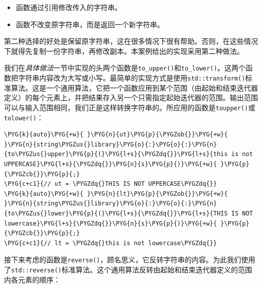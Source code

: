 
\begin{itemize}
\item 函数通过引用修改传入的字符串。



\item 函数不改变原字符串，而是返回一个新字符串。

\end{itemize}



第二种选择的好处是保留原字符串，这在很多情况下很有帮助。否则，在这些情况下就得先复制一份字符串，再修改副本。本案例给出的实现采用第二种做法。



我们在\textit{具体做法}一节中实现的头两个函数是\texttt{to\_\allowbreak{}upper()}和\texttt{to\_\allowbreak{}lower()}。这两个函数把字符串内容改为大写或小写。最简单的实现方式是使用\texttt{std::\allowbreak{}transform()}标准算法。这是一个通用算法，它把一个函数应用到某个范围（由起始和结束迭代器定义）的每个元素上，并把结果存入另一个只需指定起始迭代器的范围。输出范围可以与输入范围相同，我们正是这样转换字符串的。所应用的函数是\texttt{toupper()}或\texttt{tolower()}：



\begin{codeblockbg}
\begin{Verbatim}[commandchars=\\\{\},breaklines=true,breakanywhere=true,fontsize=\codefont,xleftmargin=17bp]
\PYG{k}{auto}\PYG{+w}{ }\PYG{n}{ut}\PYG{p}{\PYGZob{}}\PYG{+w}{ }\PYG{n}{string\PYGZus{}library}\PYG{o}{:}\PYG{o}{:}\PYG{n}{to\PYGZus{}upper}\PYG{p}{(}\PYG{l+s}{\PYGZdq{}}\PYG{l+s}{this is not UPPERCASE}\PYG{l+s}{\PYGZdq{}}\PYG{n}{s}\PYG{p}{)}\PYG{+w}{ }\PYG{p}{\PYGZcb{}}\PYG{p}{;}
\PYG{c+c1}{// ut = \PYGZdq{}THIS IS NOT UPPERCASE\PYGZdq{}}
\PYG{k}{auto}\PYG{+w}{ }\PYG{n}{lt}\PYG{p}{\PYGZob{}}\PYG{+w}{ }\PYG{n}{string\PYGZus{}library}\PYG{o}{:}\PYG{o}{:}\PYG{n}{to\PYGZus{}lower}\PYG{p}{(}\PYG{l+s}{\PYGZdq{}}\PYG{l+s}{THIS IS NOT lowercase}\PYG{l+s}{\PYGZdq{}}\PYG{n}{s}\PYG{p}{)}\PYG{+w}{ }\PYG{p}{\PYGZcb{}}\PYG{p}{;}
\PYG{c+c1}{// lt = \PYGZdq{}this is not lowercase\PYGZdq{}}
\end{Verbatim}
\end{codeblockbg}



接下来考虑的函数是\texttt{reverse()}，顾名思义，它反转字符串的内容。为此我们使用了\texttt{std::\allowbreak{}reverse()}标准算法。这个通用算法反转由起始和结束迭代器定义的范围内各元素的顺序：


